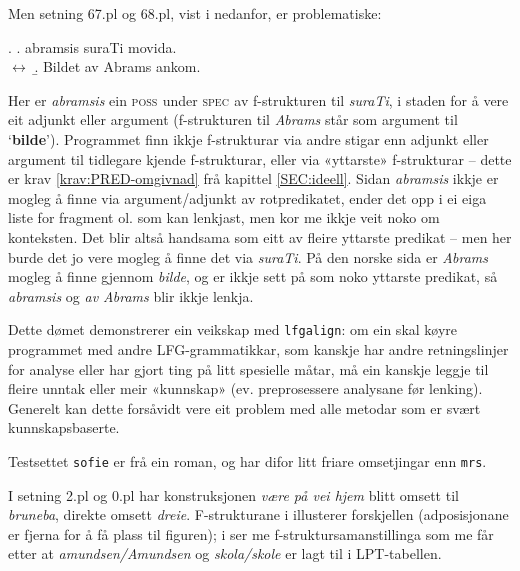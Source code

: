 \documentclass[12pt,a4paper,oneside,draft]{report}
\newcommand{\F}[2]{\textsc{#1}\ensuremath{_{#2}}}
\newcommand{\SPEC}{\F{spec}{}}
\newcommand{\POSS}{\F{poss}{}}
\newcommand{\p}[1]{`\textbf{#1}'}
\begin{document}
Men setning 67.pl og 68.pl, vist i \Next nedanfor, er problematiske:

\ex. \a. abramsis suraTi movida.\\
     $\leftrightarrow$
     \b. Bildet av Abrams ankom.

Her er \emph{abramsis} ein \POSS{} under \SPEC{} av f\hyp{}strukturen til
 \emph{suraTi}, i staden for å vere eit adjunkt eller argument
 (f\hyp{}strukturen til \emph{Abrams} står som argument til
 \p{bilde}). Programmet finn ikkje f\hyp{}strukturar via andre stigar enn
 adjunkt eller argument til tidlegare kjende f\hyp{}strukturar, eller via
 «yttarste» f\hyp{}strukturar -- dette er krav \ref{krav:PRED-omgivnad} frå
 kapittel \ref{SEC:ideell}. Sidan \emph{abramsis} ikkje er mogleg å finne
 via argument/adjunkt av rotpredikatet, ender det opp i ei eiga liste
 for fragment ol. som kan lenkjast, men kor me ikkje veit noko om
 konteksten. Det blir altså handsama som eitt av fleire yttarste
 predikat -- men her burde det jo vere mogleg å finne det via
 \emph{suraTi}. På den norske sida er \emph{Abrams} mogleg å finne gjennom
 \emph{bilde}, og er ikkje sett på som noko yttarste predikat, så
 \emph{abramsis} og \emph{av Abrams} blir ikkje lenkja.

Dette dømet demonstrerer ein veikskap med \texttt{lfgalign}: om ein skal
 køyre programmet med andre LFG-grammatikkar, som kanskje har andre
 retningslinjer for analyse eller har gjort ting på litt spesielle
 måtar, må ein kanskje leggje til fleire unntak eller meir «kunnskap»
 (ev. preprosessere analysane før lenking). Generelt kan dette
 forsåvidt vere eit problem med alle metodar som er svært
 kunnskapsbaserte.


Testsettet \texttt{sofie} er frå ein roman, og har difor litt friare
 omsetjingar enn \texttt{mrs}.

I setning 2.pl og 0.pl har konstruksjonen \emph{være på vei hjem} blitt
 omsett til \emph{bruneba}, direkte omsett \emph{dreie}. F\hyp{}strukturane i
 \Next illusterer forskjellen (adposisjonane er fjerna for å få plass
 til figuren); i \NNext ser me f\hyp{}struktursamanstillinga som me
 får etter at \emph{amundsen/Amundsen} og \emph{skola/skole} er lagt til i
 LPT-tabellen.
\end{document}
